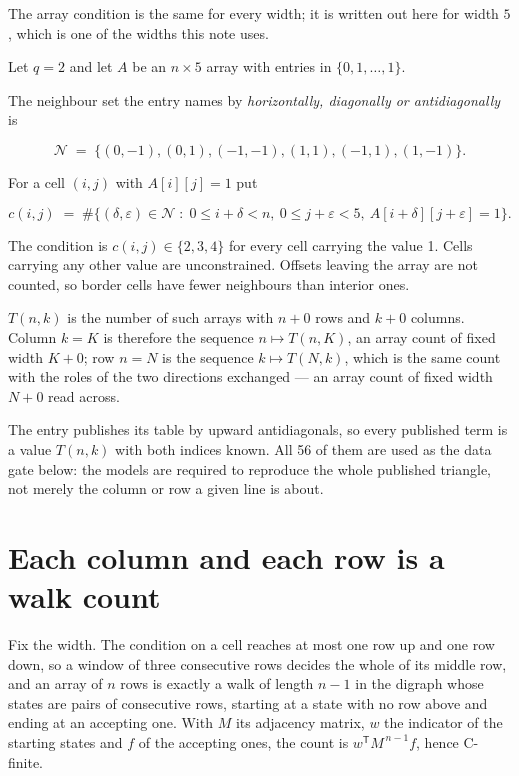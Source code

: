 \documentclass[11pt]{article}
\theoremstyle{definition}
\begin{document}
The array condition is the same for every width; it is written out here for width $5$, which is one of the widths this note uses.

Let $q = 2$ and let $A$ be an $n \times 5$ array with entries in $\{0,1,\dots,1\}$.

The neighbour set the entry names by {\itshape horizontally, diagonally or antidiagonally} is

\[\mathcal{N} \;=\; \{(0,-1), (0,1), (-1,-1), (1,1), (-1,1), (1,-1)\}.\]

For a cell $(i,j)$ with $A[i][j] = 1$ put

\[c(i,j) \;=\; \#\bigl\{(\delta,\varepsilon)\in\mathcal{N} \;:\; 0\le i+\delta<n,\ 0\le j+\varepsilon<5,\ A[i+\delta][j+\varepsilon] = 1\bigr\}.\]

The condition is $c(i,j) \in \{2, 3, 4\}$ for every cell carrying the value 1. Cells carrying any other value are unconstrained. Offsets leaving the array are not counted, so border cells have fewer neighbours than interior ones.

$T(n,k)$ is the number of such arrays with $n + 0$ rows and $k + 0$ columns. Column $k = K$ is therefore the sequence $n \mapsto T(n,K)$, an array count of fixed width $K + 0$; row $n = N$ is the sequence $k \mapsto T(N,k)$, which is the same count with the roles of the two directions exchanged --- an array count of fixed width $N + 0$ read across.

The entry publishes its table by upward antidiagonals, so every published term is a value $T(n,k)$ with both indices known. All 56 of them are used as the data gate below: the models are required to reproduce the whole published triangle, not merely the column or row a given line is about.

\section{Each column and each row is a walk count}

Fix the width. The condition on a cell reaches at most one row up and one row down, so a window of three consecutive rows decides the whole of its middle row, and an array of $n$ rows is exactly a walk of length $n-1$ in the digraph whose states are pairs of consecutive rows, starting at a state with no row above and ending at an accepting one. With $M$ its adjacency matrix, $w$ the indicator of the starting states and $f$ of the accepting ones, the count is $w^{\mathsf T}M^{\,n-1}f$, hence C-finite.
\end{document}
